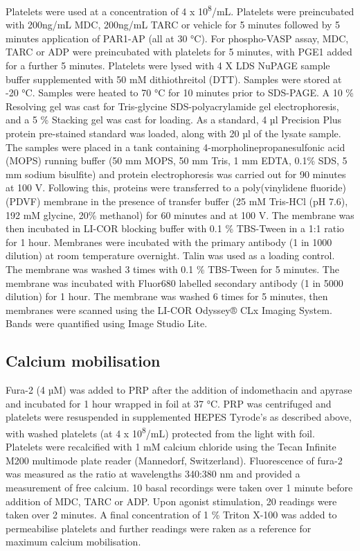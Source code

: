 \documentclass[11pt,twoside]{bristolthesis}
\begin{document}
Platelets were used at a concentration of 4 x 10\textsuperscript{8}/mL. Platelets were preincubated with 200ng/mL MDC, 200ng/mL TARC or vehicle for 5 minutes followed by 5 minutes application of PAR1-AP (all at 30 °C). For phospho-VASP assay, MDC, TARC or ADP were preincubated with platelets for 5 minutes, with PGE1 added for a further 5 minutes. Platelets were lysed with 4 X LDS NuPAGE sample buffer supplemented with 50 mM dithiothreitol (DTT). Samples were stored at -20 °C. Samples were heated to 70 °C for 10 minutes prior to SDS-PAGE. A 10 \% Resolving gel was cast for Tris-glycine SDS-polyacrylamide gel electrophoresis, and a 5 \% Stacking gel was cast for loading. As a standard, 4 µl Precision Plus protein pre-stained standard was loaded, along with 20 µl of the lysate sample. The samples were placed in a tank containing 4-morpholinepropanesulfonic acid (MOPS) running buffer (50 mm MOPS, 50 mm Tris, 1 mm EDTA, 0.1\% SDS, 5 mm sodium bisulfite) and protein electrophoresis was carried out for 90 minutes at 100 V. Following this, proteins were transferred to a poly(vinylidene fluoride) (PDVF) membrane in the presence of transfer buffer (25 mM Tris-HCl (pH 7.6), 192 mM glycine, 20\% methanol) for 60 minutes and at 100 V. The membrane was then incubated in LI-COR blocking buffer with 0.1 \% TBS-Tween in a 1:1 ratio for 1 hour. Membranes were incubated with the primary antibody (1 in 1000 dilution) at room temperature overnight. Talin was used as a loading control. The membrane was washed 3 times with 0.1 \% TBS-Tween for 5 minutes. The membrane was incubated with Fluor680 labelled secondary antibody (1 in 5000 dilution) for 1 hour. The membrane was washed 6 times for 5 minutes, then membranes were scanned using the LI-COR Odyssey® CLx Imaging System. Bands were quantified using Image Studio Lite.

\hypertarget{calcium-mobilisation}{%
\subsection{Calcium mobilisation}\label{calcium-mobilisation}}

Fura-2 (4 µM) was added to PRP after the addition of indomethacin and apyrase and incubated for 1 hour wrapped in foil at 37 °C. PRP was centrifuged and platelets were resuspended in supplemented HEPES Tyrode's as described above, with washed platelets (at 4 x 10\textsuperscript{8}/mL) protected from the light with foil. Platelets were recalcified with 1 mM calcium chloride using the Tecan Infinite M200 multimode plate reader (Mannedorf, Switzerland). Fluorescence of fura-2 was measured as the ratio at wavelengths 340:380 nm and provided a measurement of free calcium. 10 basal recordings were taken over 1 minute before addition of MDC, TARC or ADP. Upon agonist stimulation, 20 readings were taken over 2 minutes. A final concentration of 1 \% Triton X-100 was added to permeabilise platelets and further readings were raken as a reference for maximum calcium mobilisation.
\end{document}
